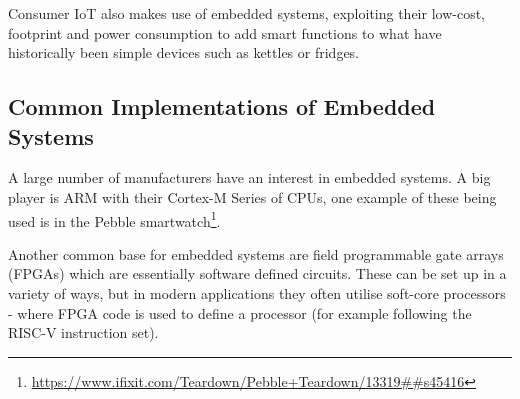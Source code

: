 Consumer IoT also makes use of embedded systems, exploiting their low-cost, footprint and power consumption to add smart functions to what have historically been simple devices such as kettles or fridges.

\subsection{Common Implementations of Embedded Systems}\label{implementationsEmbeddedSystems}
A large number of manufacturers have an interest in embedded systems. A big player is ARM with their Cortex-M Series of CPUs, one example of these being used is in the Pebble smartwatch\footnote{\url{https://www.ifixit.com/Teardown/Pebble+Teardown/13319##s45416}}.

Another common base for embedded systems are field programmable gate arrays (FPGAs) which are essentially software defined circuits. These can be set up in a variety of ways, but in modern applications they often utilise soft-core processors - where FPGA code is used to define a processor (for example following the RISC-V instruction set).
